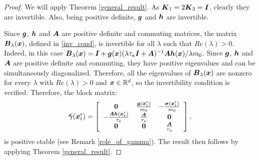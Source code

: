 \begin{proof} We will apply Theorem \ref{general_result}. As $\boldsymbol{K}_1=2 \boldsymbol{K}_2 = \boldsymbol{I}$, clearly they are invertible. Also, being positive definite, $\boldsymbol{g}$ and $\boldsymbol{h}$ are invertible. 

Since $\boldsymbol{g}$, $\boldsymbol{h}$ and $\boldsymbol{A}$ are positive definite and commuting matrices, the matrix $\boldsymbol{B}_{\lambda}(\boldsymbol{x})$, defined in \eqref{inv_cond}, is invertible for all $\lambda$ such that $Re(\lambda) > 0$. Indeed, in this case  $\boldsymbol{B}_{\lambda}(\boldsymbol{x}) = \boldsymbol{I} + \boldsymbol{g}(\boldsymbol{x})(\lambda \tau_{\kappa} \boldsymbol{I} + \boldsymbol{A})^{-1} \boldsymbol{A} \boldsymbol{h}(\boldsymbol{x})/\lambda m_0$. Since $\boldsymbol{g}$, $\boldsymbol{h}$ and $\boldsymbol{A}$ are positive definite and commuting, they have positive eigenvalues and can be simultaneously diagonalized. Therefore, all the eigenvalues of $\boldsymbol{B}_{\lambda}(\boldsymbol{x})$ are nonzero for every $\lambda$ with $Re(\lambda) > 0$ and $\boldsymbol{x} \in \mathbb{R}^d$, so the invertibility condition is verified.  Therefore, the block matrix:
\begin{equation}  \label{nsk2}
\boldsymbol{\hat{\gamma}}(\boldsymbol{x}^\epsilon_{t}) = \left[ \begin{array}{ccc} \boldsymbol{0} & \frac{\boldsymbol{g}(\boldsymbol{x}^\epsilon_{t})}{m_{0}} & -\frac{\boldsymbol{\sigma}(\boldsymbol{x}^\epsilon_{t})}{m_{0}}   \\ -\frac{\boldsymbol{A} \boldsymbol{h}(\boldsymbol{x}^\epsilon_{t}) }{\tau_{\kappa}}  & \frac{\boldsymbol{A}}{\tau_{\kappa}} & \boldsymbol{0}  \\  \boldsymbol{0}  & \boldsymbol{0}  & \frac{\boldsymbol{A}}{\tau_{\eta}} \end{array} \right],
\end{equation}
 is positive stable (see Remark \ref{role_of_gamma}).
The result then follows by applying Theorem \ref{general_result}. 
\end{proof}

